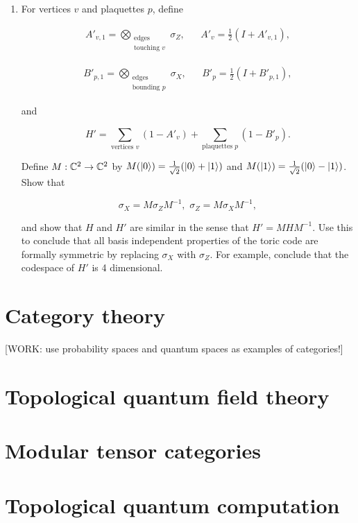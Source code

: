 \documentclass{article}
\theoremstyle{definition}
\numberwithin{figure}{section}
\begin{document}
\begin{enumerate}[\thesection .1.]

\item For vertices $v$ and plaquettes $p$, define

\begin{align*}
A'_{v,1}=\bigotimes_{\substack{\text{edges} \\ \text{touching }v}}\sigma_Z, && A'_v=\frac{1}{2}\left(I + A'_{v,1}\right),
\end{align*}

\begin{align*}
B'_{p,1}=\bigotimes_{\substack{\text{edges} \\ \text{bounding }p}}\sigma_X, && B'_p=\frac{1}{2}\left(I + B'_{p,1}\right),
\end{align*}

and

$$H'=\sum_{\text{vertices }v}(1-A'_v)+\sum_{\text{plaquettes }p}(1-B'_p).$$

Define $M:\mathbb{C}^2\to \mathbb{C}^2$ by $M(\ket{0})=\frac{1}{\sqrt{2}}(\ket{0}+\ket{1})$ and $M(\ket{1})=\frac{1}{\sqrt{2}}(\ket{0}-\ket{1})$. Show that

$$\sigma_X=M\sigma_ZM^{-1},\,\, \sigma_{Z}=M\sigma_X M^{-1},$$

and show that $H$ and $H'$ are similar in the sense that $H'=MHM^{-1}$. Use this to conclude that all basis independent properties of the toric code are formally symmetric by replacing $\sigma_X$ with $\sigma_Z$. For example, conclude that the codespace of $H'$ is 4 dimensional.

\end{enumerate}

\section{Category theory}

[WORK: use probability spaces and quantum spaces as examples of categories!]

\section{Topological quantum field theory}

\section{Modular tensor categories}

\section{Topological quantum computation}
\end{document}
